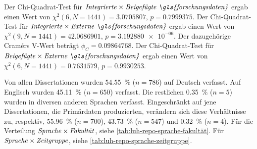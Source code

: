 Der Chi-Quadrat-Test für $\text{\textit{Integrierte}}\times\text{\textit{Beigefügte \gls{forschungsdaten}}}$ ergab einen Wert von $\chi^2 (\num{6}, N = \num{1441}) = \num[round-mode=places,round-precision=3]{3.0705807}$, $p = \num[round-mode=places,round-precision=3]{0.7999375}$.
Der Chi-Quadrat-Test für $\text{\textit{Integrierte}}\times\text{\textit{Externe \gls{forschungsdaten}}}$ ergab einen Wert von $\chi^2 (\num{9}, N = \num{1441}) = \num[round-mode=places,round-precision=3]{42.0686901}$, $p = \num[round-mode=places,round-precision=3]{3.192880e-06}$.
Der dazugehörige Cramérs V-Wert beträgt $\phi_C=\num[round-mode=places,round-precision=3]{0.09864768}$.
Der Chi-Quadrat-Test für $\text{\textit{Beigefügte}}\times\text{\textit{Externe \gls{forschungsdaten}}}$ ergab einen Wert von $\chi^2 (\num{6}, N = \num{1441}) = \num[round-mode=places,round-precision=3]{0.7631579}$, $p = \num[round-mode=places,round-precision=3]{0.9930253}$.

Von allen Dissertationen wurden \SI{54.55}{\percent} ($n=\num{786}$) auf Deutsch verfasst.
Auf Englisch wurden \SI{45,11}{\percent} ($n=\num{650}$) verfasst.
Die restlichen \SI{0.35}{\percent} ($n=\num{5}$) wurden in diversen anderen Sprachen verfasst.
Eingeschränkt auf jene Dissertationen, die Primärdaten produzierten, verändern sich diese Verhältnisse zu, respektiv, \SI{55.96}{\percent} ($n=\num{700}$), \SI{43,73}{\percent} ($n=\num{547}$) und \SI{0.32}{\percent} ($n=\num{4}$).
Für die Verteilung $\text{\textit{Sprache}}\times\text{\textit{Fakultät}}$, siehe \cref{tab:luh-repo-sprache-fakultät}.
Für $\text{\textit{Sprache}}\times\text{\textit{Zeitgruppe}}$, siehe \cref{tab:luh-repo-sprache-zeitgruppe}.

